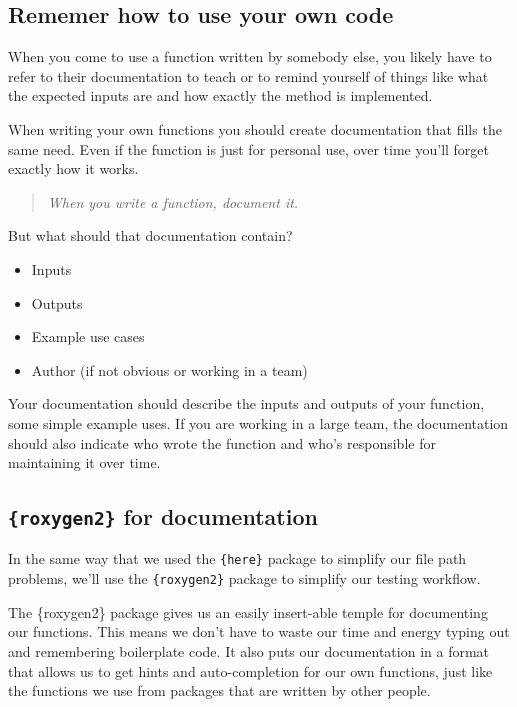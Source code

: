 \documentclass[
  12pt,
]{book}
\providecommand{\tightlist}{%
  \setlength{\itemsep}{0pt}\setlength{\parskip}{0pt}}
\begin{document}
\hypertarget{rememer-how-to-use-your-own-code}{%
\subsection{Rememer how to use your own code}\label{rememer-how-to-use-your-own-code}}

When you come to use a function written by somebody else, you likely have to refer to their documentation to teach or to remind yourself of things like what the expected inputs are and how exactly the method is implemented.

When writing your own functions you should create documentation that fills the same need. Even if the function is just for personal use, over time you'll forget exactly how it works.

\begin{quote}
\emph{When you write a function, document it.}
\end{quote}

But what should that documentation contain?

\begin{itemize}
\tightlist
\item
  Inputs
\item
  Outputs
\item
  Example use cases
\item
  Author (if not obvious or working in a team)
\end{itemize}

Your documentation should describe the inputs and outputs of your function, some simple example uses. If you are working in a large team, the documentation should also indicate who wrote the function and who's responsible for maintaining it over time.

\hypertarget{roxygen2-for-documentation}{%
\subsection{\texorpdfstring{\texttt{\{roxygen2\}} for documentation}{\{roxygen2\} for documentation}}\label{roxygen2-for-documentation}}

In the same way that we used the \texttt{\{here\}} package to simplify our file path problems, we'll use the \texttt{\{roxygen2\}} package to simplify our testing workflow.

The \{roxygen2\} package gives us an easily insert-able temple for documenting our functions. This means we don't have to waste our time and energy typing out and remembering boilerplate code. It also puts our documentation in a format that allows us to get hints and auto-completion for our own functions, just like the functions we use from packages that are written by other people.
\end{document}
